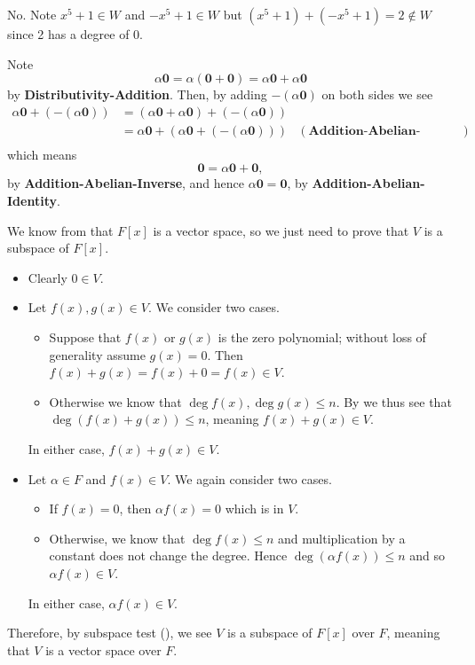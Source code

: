 \begin{questions}
    \item No. Note $x^5 + 1 \in W$ and $-x^5 + 1 \in W$ but $(x^5+1) + (-x^5+1) = 2 \notin W$ since 2 has a degree of 0.

    \item Note
    \[
        \alpha\textbf{0} = \alpha(\textbf{0} + \textbf{0}) = \alpha\textbf{0} + \alpha\textbf{0}
    \]
    by \textbf{Distributivity-Addition}. Then, by adding $-(\alpha\textbf{0})$ on both sides we see
    \begin{align*}
        \alpha\textbf{0} + (-(\alpha\textbf{0})) &= (\alpha\textbf{0} + \alpha\textbf{0}) + (-(\alpha\textbf{0}))\\
        &= \alpha\textbf{0} + (\alpha\textbf{0} + (-(\alpha\textbf{0}))) & (\textbf{Addition-Abelian-Associativity})\\
    \end{align*}
    which means
    \[
        \textbf{0} = \alpha\textbf{0} + \textbf{0},
    \]
    by \textbf{Addition-Abelian-Inverse}, and hence $\alpha\textbf{0} = \textbf{0}$, by \textbf{Addition-Abelian-Identity}.

    \item We know from  that $F[x]$ is a vector space, so we just need to prove that $V$ is a subspace of $F[x]$.
    \begin{itemize}
        \item Clearly $0 \in V$.
        \item Let $f(x), g(x) \in V$. We consider two cases.
        \begin{itemize}
            \item Suppose that $f(x)$ or $g(x)$ is the zero polynomial; without loss of generality assume $g(x) = 0$. Then $f(x) + g(x) = f(x) + 0 = f(x) \in V$.
            \item Otherwise we know that $\deg f(x), \deg g(x) \leq n$. By  we thus see that $\deg (f(x) + g(x)) \leq n$, meaning $f(x) + g(x) \in V$.
        \end{itemize}
        In either case, $f(x) + g(x) \in V$.
        \item Let $\alpha \in F$ and $f(x) \in V$. We again consider two cases.
        \begin{itemize}
            \item If $f(x) = 0$, then $\alpha f(x) = 0$ which is in $V$.
            \item Otherwise, we know that $\deg f(x) \leq n$ and multiplication by a constant does not change the degree. Hence $\deg (\alpha f(x)) \leq n$ and so $\alpha f(x) \in V$.
        \end{itemize}
        In either case, $\alpha f(x) \in V$.
    \end{itemize}
    Therefore, by subspace test (), we see $V$ is a subspace of $F[x]$ over $F$, meaning that $V$ is a vector space over $F$.


\end{questions}
